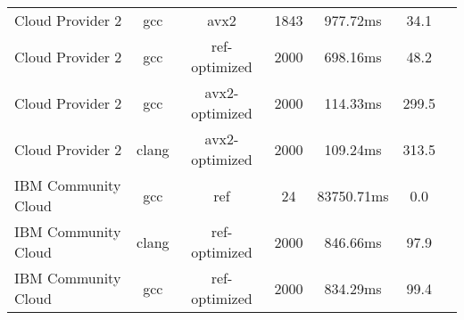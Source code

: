 \begin{table}
\begin{tabularx}{\linewidth}{X c c c c c c}
            Cloud Provider 2 &                  gcc &                 avx2 &                 1843 &             977.72ms &                 34.1\\
            Cloud Provider 2 &                  gcc &        ref-optimized &                 2000 &             698.16ms &                 48.2\\
            Cloud Provider 2 &                  gcc &       avx2-optimized &                 2000 &             114.33ms &                299.5\\
            Cloud Provider 2 &                clang &       avx2-optimized &                 2000 &             109.24ms &                313.5\\
         IBM Community Cloud &                  gcc &                  ref &                   24 &           83750.71ms &                  0.0\\
         IBM Community Cloud &                clang &        ref-optimized &                 2000 &             846.66ms &                 97.9\\
         IBM Community Cloud &                  gcc &        ref-optimized &                 2000 &             834.29ms &                 99.4 \\
        \bottomrule
    \end{tabularx}
\end{table}